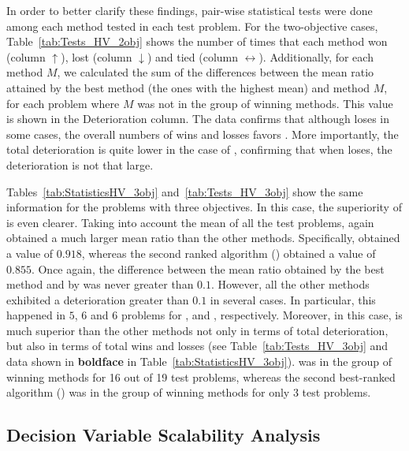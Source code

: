 


In order to better clarify these findings, pair-wise statistical tests were done among each method tested in each
test problem.
%
For the two-objective cases, Table~\ref{tab:Tests_HV_2obj} shows the number of times that each method won (column $\uparrow$),
lost (column $\downarrow$) and tied (column $\leftrightarrow$).
%
Additionally, for each method $M$, we calculated the sum of the differences between the mean \HV{} ratio attained by the best method 
(the ones with the highest mean) and method $M$, for each problem where $M$ was not in the group of winning methods.
%
This value is shown in the Deterioration column.
%
The data confirms that although \VSDMOEA{} loses in some cases, the overall numbers of wins and losses
favors \VSDMOEA{}.
%
More importantly, the total deterioration is quite lower in the case of \VSDMOEA{}, confirming that when \VSDMOEA{} loses, the deterioration is not 
that large.

Tables~\ref{tab:StatisticsHV_3obj} and~\ref{tab:Tests_HV_3obj} show the same information for the problems with three objectives.
%
In this case, the superiority of \VSDMOEA{} is even clearer.
%
Taking into account the mean of all the test problems, \VSDMOEA{} again obtained a much larger mean \HV{} ratio than the other methods.
%
Specifically, \VSDMOEA{} obtained a value of $0.918$, whereas the second ranked algorithm (\RMOEA{}) obtained a value of $0.855$.
%
Once again, the difference between the mean \HV{} ratio obtained by the best method and by \VSDMOEA{} was never greater
than $0.1$.
%
However, all the other methods exhibited a deterioration greater than $0.1$ in several cases.
%
In particular, this happened in $5$, $6$ and $6$ problems for \RMOEA{}, \NSGAII{} and \MOEAD{}, respectively.
%
Moreover, in this case, \VSDMOEA{} is much superior than the other methods not only in terms of total deterioration, but also
in terms of total wins and losses (see Table~\ref{tab:Tests_HV_3obj} and data shown in {\bf boldface} 
in Table~\ref{tab:StatisticsHV_3obj}).
%
\VSDMOEA{} was in the group of winning methods for 16 out of 19 test problems, whereas the second best-ranked algorithm (\RMOEA{})
was in the group of winning methods for only 3 test problems.

\subsection{Decision Variable Scalability Analysis}

